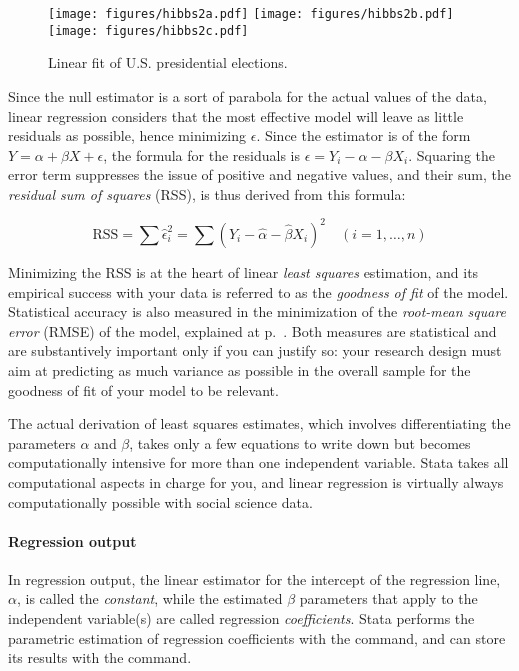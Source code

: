   \begin{figure}[htp]
  	\centering
  	\texttt{[image: figures/hibbs2a.pdf]}
  	\texttt{[image: figures/hibbs2b.pdf]}
  	\texttt{[image: figures/hibbs2c.pdf]}

  	\caption[Linear fit of U.S. presidential elections]{\label{fig:hibbs_fit}
  	Linear fit of U.S. presidential elections.\\
  	}
  \end{figure}%

  Since the null estimator is a sort of parabola for the actual values of the data, linear regression considers that the most effective model will leave as little residuals as possible, hence minimizing $\epsilon$. Since the estimator is of the form $Y = \alpha + \beta X + \epsilon$, the formula for the residuals is $\epsilon = Y_i - \alpha - \beta X_i$. Squaring the error term suppresses the issue of positive and negative values, and their sum, the \emph{residual sum of squares} (RSS), is thus derived from this formula:

  $$\text{RSS} = \sum{\hat{\epsilon}_i^2} = \sum{(Y_i-\hat{\alpha}-\hat{\beta} X_i)^2} \quad (i = 1, \ldots, n)$$

  Minimizing the RSS is at the heart of linear \emph{least squares} estimation, and its empirical success with your data is referred to as the \emph{goodness of fit} of the model. Statistical accuracy is also measured in the minimization of the \emph{root-mean square error} (\label{rmse}RMSE) of the model, explained at p.~\pageref{rmse_explained}. Both measures are statistical and are substantively important only if you can justify so: your research design must aim at predicting as much variance as possible in the overall sample for the goodness of fit of your model to be relevant.

  The actual derivation of least squares estimates, which involves differentiating the parameters $\alpha$ and $\beta$, takes only a few equations to write down but becomes computationally intensive for more than one independent variable. Stata takes all computational aspects in charge for you, and linear regression is virtually always computationally possible with social science data.
  
  \paragraph{Regression output}

  In regression output, the linear estimator for the intercept of the regression line, $\alpha$, is called the \emph{constant}, while the estimated $\beta$ parameters that apply to the independent variable(s) are called regression \emph{coefficients}. Stata performs the parametric estimation of regression coefficients with the  command, and can store its results with the  command.


